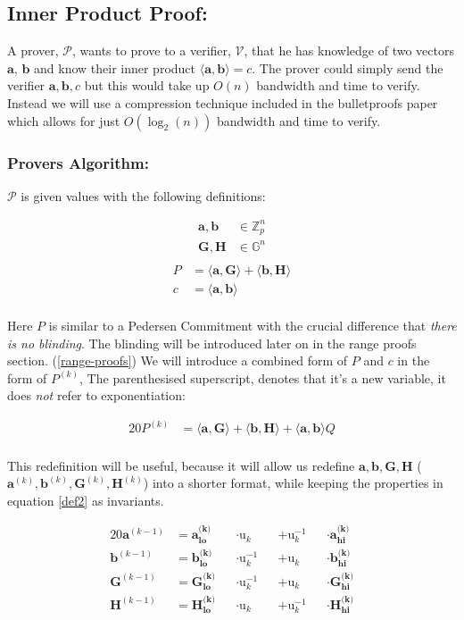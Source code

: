 \documentclass{article}
\newcommand{\eq}[1]{\begin{alignat*}{20}#1\end{alignat*}}
\newcommand{\eqn}[2]{\begin{equation}\label{#1}\begin{split}#2\end{split}\end{equation}}
\renewcommand{\vec}[1]{\boldsymbol{#1}}
\newcommand{\ran}[1]{\mathrm{#1}}
\newcommand{\V}{\mathcal{V}}
\renewcommand{\P}{\mathcal{P}}
\newcommand{\G}{\mathbb{G}}
\newcommand{\Z}{\mathbb{Z}}
\newcommand{\dotp}[2]{\langle #1, #2 \rangle}
\newcommand{\opn}[1]{\operatorname{#1}}
\newcommand{\veclo}[1]{\vec{#1_{\opn{lo}}}}
\newcommand{\vechi}[1]{\vec{#1_{\opn{hi}}}}
\begin{document}
\subsection{Inner Product Proof:}
A prover, $\P$, wants to prove to a verifier, $\V$, that he has
knowledge of two vectors $\vec{a}$, $\vec{b}$ and know their inner
product $\dotp{\vec{a}}{\vec{b}} = c$. The prover could simply send
the verifier $\vec{a}, \vec{b}, c$ but this would take up $O(n)$
bandwidth and time to verify. Instead we will use a compression
technique included in the bulletproofs paper which allows for just
$O(\log_2(n))$ bandwidth and time to verify.

\subsubsection{Provers Algorithm:}
$\P$ is given values with the following definitions:

\eqn{ipp-def1}{
	\vec{a}, \vec{b} &\in \Z^n_p \\
	\vec{G}, \vec{H} &\in \G^n \\
}
\eqn{ipp-def2}{
	P &= \dotp{\vec{a}}{\vec{G}} + \dotp{\vec{b}}{\vec{H}} \\
	c &= \dotp{\vec{a}}{\vec{b}} \\
}

Here $P$ is similar to a Pedersen Commitment with the crucial difference
that \textit{there is no blinding}. The blinding will be introduced
later on in the range proofs section. (\ref{range-proofs}) We will
introduce a combined form of $P$ and $c$ in the form of $P^{(k)}$,
The parenthesised superscript, denotes that it's a new variable,
it does \textit{not} refer to exponentiation:

\eq{
	P^{(k)} &= \dotp{\vec{a}}{\vec{G}} +
	           \dotp{\vec{b}}{\vec{H}} +
	           \dotp{\vec{a}}{\vec{b}}Q \\
} 

This redefinition will be useful, because it will allow us redefine
$\vec{a}, \vec{b}, \vec{G}, \vec{H}$ ($\vec{a}^{(k)}, \vec{b}^{(k)},
\vec{G}^{(k)}, \vec{H}^{(k)}$) into a shorter format, while keeping the
properties in equation \ref{def2} as invariants.

\eq{
	\vec{a}^{(k-1)} &= \veclo{a^{\text{(k)}}} &&\cdot \ran{u}_k      &&+ \ran{u}^{-1}_k &&\cdot \vechi{a^{\text{(k)}}} \\
	\vec{b}^{(k-1)} &= \veclo{b^{\text{(k)}}} &&\cdot \ran{u}^{-1}_k &&+ \ran{u}_k      &&\cdot \vechi{b^{\text{(k)}}} \\
	\vec{G}^{(k-1)} &= \veclo{G^{\text{(k)}}} &&\cdot \ran{u}^{-1}_k &&+ \ran{u}_k      &&\cdot \vechi{G^{\text{(k)}}} \\
	\vec{H}^{(k-1)} &= \veclo{H^{\text{(k)}}} &&\cdot \ran{u}_k      &&+ \ran{u}^{-1}_k &&\cdot \vechi{H^{\text{(k)}}} \\
}
\end{document}
